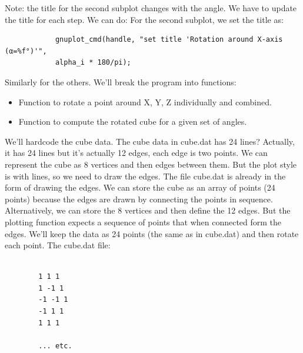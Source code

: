 \documentclass[a4paper,10pt]{article}
\begin{document}
Note: the title for the second subplot changes with the angle. We have to update the title for each step.
We can do: For the second subplot, we set the title as:
\begin{verbatim}
            gnuplot_cmd(handle, "set title 'Rotation around X-axis (α=%f°)'",
            alpha_i * 180/pi);
\end{verbatim}
Similarly for the others. We'll break the program into functions:
\begin{itemize}
\item Function to rotate a point around X, Y, Z individually and combined.
\item Function to compute the rotated cube for a given set of angles.
\end{itemize}
We'll hardcode the cube data.
The cube data in cube.dat has 24 lines? Actually, it has 24 lines but it's actually 12 edges, each edge is two points.
We can represent the cube as 8 vertices and then edges between them.
But the plot style is with lines, so we need to draw the edges. The file cube.dat is already in the form of drawing the edges.
We can store the cube as an array of points (24 points) because the edges are drawn by connecting the points in sequence.
Alternatively, we can store the 8 vertices and then define the 12 edges. But the plotting function expects a sequence of points that when connected form the edges. We'll keep the data as 24 points (the same as in cube.dat) and then rotate each point.
The cube.dat file:
\begin{verbatim}

        1 1 1
        1 -1 1
        -1 -1 1
        -1 1 1
        1 1 1

        ... etc.
\end{verbatim}
\end{document}
